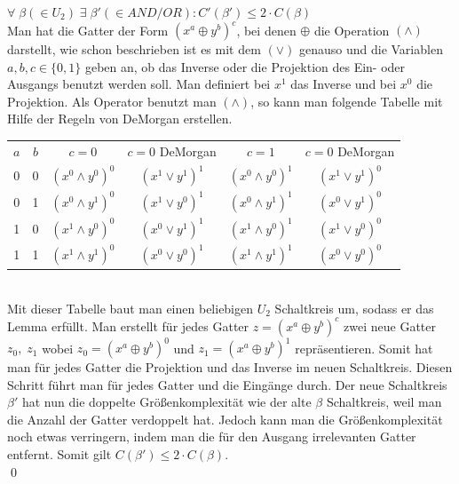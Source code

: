 \documentclass[a4paper]{article}
\begin{document}
$\forall \; \beta (\in U_2) \; \exists \; \beta' (\in AND/OR) : C'(\beta') \leq 2 \cdot C(\beta)$\\

Man hat die Gatter der Form $(x^a\oplus y^b)^c$, bei denen $\oplus$ die Operation $(\wedge)$ darstellt,
wie schon beschrieben ist es mit dem $(\vee)$ genauso und die Variablen $a,b,c \in \{0,1\}$ geben an, ob das Inverse oder die Projektion des
Ein- oder Ausgangs benutzt werden soll. Man definiert bei $x^1$ das Inverse und bei $x^0$ die Projektion. Als Operator benutzt man
$(\wedge)$, so kann man folgende Tabelle mit Hilfe der Regeln von DeMorgan erstellen.\\

\begin{tabular}{|cc|c|c|c|c|}\hline
  $a$   & $b$   & $c = 0$                               & $c = 0$ DeMorgan                              & $c=1$                                                 & $c = 0$ DeMorgan\\
  0     & 0     & $(x^0 \wedge y^0)^0$                  & $(x^1 \vee y^1)^1$                            & $(x^0 \wedge y^0)^1$                                  & $(x^1 \vee y^1)^0$ \\
  0     & 1     & $(x^0 \wedge y^1)^0$                  & $(x^1 \vee y^0)^1$                            & $(x^0 \wedge y^1)^1$                                  & $(x^0 \vee y^1)^0$ \\
  1     & 0     & $(x^1 \wedge y^0)^0$                  & $(x^0 \vee y^1)^1$                            & $(x^1 \wedge y^0)^1$                                  & $(x^1 \vee y^0)^0$ \\
  1     & 1     & $(x^1 \wedge y^1)^0$                  & $(x^0 \vee y^0)^1$                            & $(x^1 \wedge y^1)^1$                                  & $(x^0 \vee y^0)^0$ \\ \hline
\end{tabular}\\

Mit dieser Tabelle baut man einen beliebigen $U_2$ Schaltkreis um, sodass er das Lemma erf\"ullt.
Man %
erstellt f\"ur jedes Gatter $z = (x^a\oplus y^b)^c$
zwei neue Gatter $z_0, \;z_1$ wobei $z_0 = (x^a\oplus y^b)^0$ und $z_1 =  (x^a\oplus y^b)^1$ repr\"asentieren. Somit hat man f\"ur jedes Gatter die
Projektion und das Inverse im neuen Schaltkreis. Diesen Schritt f\"uhrt man f\"ur jedes Gatter und die Eing\"ange durch.
Der neue Schaltkreis $\beta'$ hat nun die doppelte Gr\"o\ss{}enkomplexit\"at wie der alte $\beta$ Schaltkreis, weil man die Anzahl der Gatter
verdoppelt hat. Jedoch kann man die Gr\"o\ss{}enkomplexit\"at noch etwas verringern, indem man die f\"ur den Ausgang irrelevanten Gatter entfernt.
Somit gilt $C(\beta') \leq 2 \cdot C(\beta)$.\\
\qed{}
\end{document}
